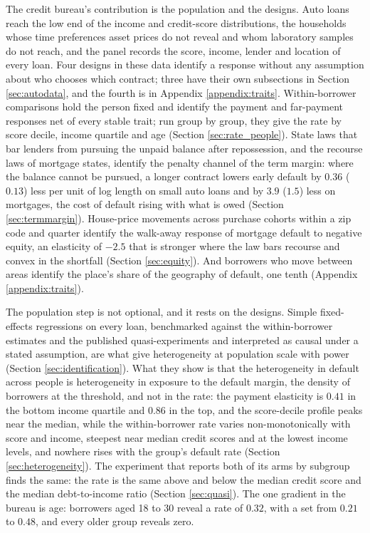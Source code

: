 The credit bureau's contribution is the population and the designs. Auto loans reach the low end of the income and credit-score distributions, the households whose time preferences asset prices do not reveal and whom laboratory samples do not reach, and the panel records the score, income, lender and location of every loan. Four designs in these data identify a response without any assumption about who chooses which contract; three have their own subsections in Section \ref{sec:autodata}, and the fourth is in Appendix \ref{appendix:traits}. Within-borrower comparisons hold the person fixed and identify the payment and far-payment responses net of every stable trait; run group by group, they give the rate by score decile, income quartile and age (Section \ref{sec:rate_people}). State laws that bar lenders from pursuing the unpaid balance after repossession, and the recourse laws of mortgage states, identify the penalty channel of the term margin: where the balance cannot be pursued, a longer contract lowers early default by $0.36$ ($0.13$) less per unit of log length on small auto loans and by $3.9$ ($1.5$) less on mortgages, the cost of default rising with what is owed (Section \ref{sec:termmargin}). House-price movements across purchase cohorts within a zip code and quarter identify the walk-away response of mortgage default to negative equity, an elasticity of $-2.5$ that is stronger where the law bars recourse and convex in the shortfall (Section \ref{sec:equity}). And borrowers who move between areas identify the place's share of the geography of default, one tenth (Appendix \ref{appendix:traits}).

The population step is not optional, and it rests on the designs. Simple fixed-effects regressions on every loan, benchmarked against the within-borrower estimates and the published quasi-experiments and interpreted as causal under a stated assumption, are what give heterogeneity at population scale with power (Section \ref{sec:identification}). What they show is that the heterogeneity in default across people is heterogeneity in exposure to the default margin, the density of borrowers at the threshold, and not in the rate: the payment elasticity is $0.41$ in the bottom income quartile and $0.86$ in the top, and the score-decile profile peaks near the median, while the within-borrower rate varies non-monotonically with score and income, steepest near median credit scores and at the lowest income levels, and nowhere rises with the group's default rate (Section \ref{sec:heterogeneity}). The experiment that reports both of its arms by subgroup finds the same: the rate is the same above and below the median credit score and the median debt-to-income ratio (Section \ref{sec:quasi}). The one gradient in the bureau is age: borrowers aged 18 to 30 reveal a rate of $0.32$, with a set from $0.21$ to $0.48$, and every older group reveals zero.

